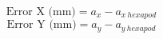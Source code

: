 
            \begin{equation}\label{eqn:error_x}
                \text{Error X (mm)} = a_x - a_{x\ hexapod}
            \end{equation}
            \begin{equation}\label{eqn:error_y}
                \text{Error Y (mm)} = a_y - a_{y\ hexapod}
            \end{equation}

    
    
     